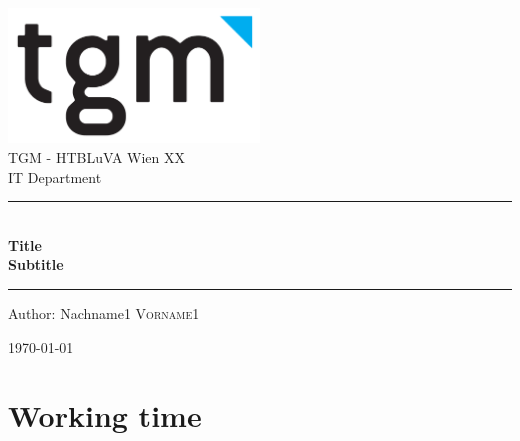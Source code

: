 \documentclass[12pt]{article}
\begin{document}
\begin{titlepage}
\begin{center}
\includegraphics[width=0.5\textwidth]{tgmlogo}\\[1cm]    

\LARGE TGM - HTBLuVA Wien XX \\ IT Department  \\[1.5cm]

\rule{1.0\textwidth}{1mm}
{ \huge \bfseries \\[0.4cm]  \huge Title \\ \LARGE Subtitle \\[0.4cm] }

\rule{1.0\textwidth}{1mm}



\noindent 
\vspace{5cm}

\begin{center}
\large
Author: 
Nachname1 \textsc{Vorname1} 
\end{center}

\vfill

{\large \today}

\end{center}
\end{titlepage}

\tableofcontents



\pagestyle{fancy}
\fancyhead[L]{\today}



\newpage



\section{Working time}
\end{document}
